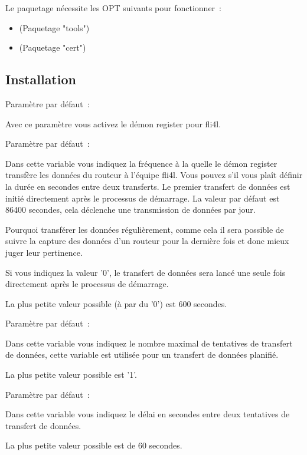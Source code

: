 Le paquetage  nécessite les OPT suivants pour fonctionner~:
\begin{itemize}
\item {} (Paquetage "tools")
\item {} (Paquetage "cert")
\end{itemize}

\subsection{Installation}

\begin{description}


Paramètre par défaut~: 

Avec ce paramètre  vous activez le démon register pour fli4l.


Paramètre par défaut~: 

Dans cette variable vous indiquez la fréquence à la quelle le démon register transfère
les données du routeur à l'équipe fli4l. Vous pouvez s'il vous plaît définir la durée en
secondes entre deux transferts. Le premier transfert de données est initié directement
après le processus de démarrage. La valeur par défaut est 86400 secondes, cela déclenche
une transmission de données par jour.

Pourquoi transférer les données régulièrement, comme cela il sera possible de suivre la
capture des données d'un routeur pour la dernière fois et donc mieux juger leur pertinence.

Si vous indiquez la valeur '0', le transfert de données sera lancé une seule fois directement
après le processus de démarrage.

La plus petite valeur possible (à par du '0') est 600 secondes.


Paramètre par défaut~: 

Dans cette variable vous indiquez le nombre maximal de tentatives de transfert de données,
cette variable est utilisée pour un transfert de données planifié.

La plus petite valeur possible est '1'.


Paramètre par défaut~: 

Dans cette variable vous indiquez le délai en secondes entre deux tentatives de transfert
de données.

La plus petite valeur possible est de 60 secondes.

\end{description}
